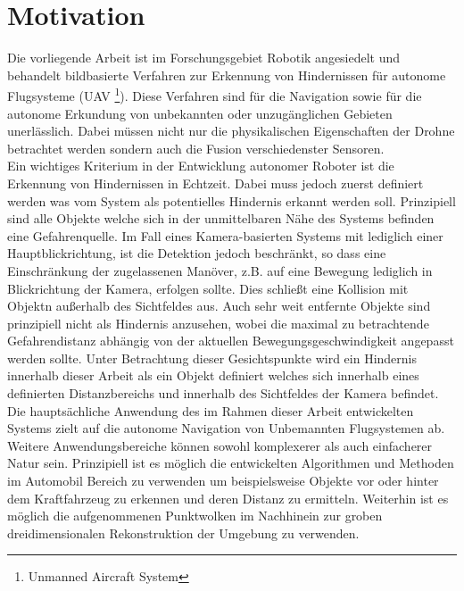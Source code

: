 \section{Motivation}
\label{sec:motivation}

Die vorliegende Arbeit ist im Forschungsgebiet Robotik angesiedelt und behandelt bildbasierte Verfahren zur Erkennung von Hindernissen für autonome Flugsysteme (UAV \footnote{Unmanned Aircraft System}). Diese Verfahren sind für die Navigation sowie für die autonome Erkundung von unbekannten oder unzugänglichen Gebieten unerlässlich. Dabei müssen nicht nur die physikalischen Eigenschaften der Drohne betrachtet werden sondern auch die Fusion verschiedenster Sensoren.\\

\noindent
Ein wichtiges Kriterium in der Entwicklung autonomer Roboter ist die Erkennung von Hindernissen in Echtzeit. Dabei muss jedoch zuerst definiert werden was vom System als potentielles Hindernis erkannt werden soll. Prinzipiell sind alle Objekte welche sich in der unmittelbaren Nähe des Systems befinden eine Gefahrenquelle. Im Fall eines Kamera-basierten Systems mit lediglich einer Hauptblickrichtung, ist die Detektion jedoch beschränkt, so dass eine Einschränkung der zugelassenen Manöver, z.B. auf eine Bewegung lediglich in Blickrichtung der Kamera, erfolgen sollte. Dies schließt eine Kollision mit Objektn außerhalb des Sichtfeldes aus. Auch sehr weit entfernte Objekte sind prinzipiell nicht als Hindernis anzusehen, wobei die maximal zu betrachtende Gefahrendistanz abhängig von der aktuellen Bewegungsgeschwindigkeit angepasst werden sollte. Unter Betrachtung dieser Gesichtspunkte wird ein Hindernis innerhalb dieser Arbeit als ein Objekt definiert welches sich innerhalb eines definierten Distanzbereichs und innerhalb des Sichtfeldes der Kamera befindet.\\

\noindent
Die hauptsächliche Anwendung des im Rahmen dieser Arbeit entwickelten Systems zielt auf die autonome Navigation von Unbemannten Flugsystemen ab. Weitere Anwendungsbereiche können sowohl komplexerer als auch einfacherer Natur sein. Prinzipiell ist es möglich die entwickelten Algorithmen und Methoden im Automobil Bereich zu verwenden um beispielsweise Objekte vor oder hinter dem Kraftfahrzeug zu erkennen und deren Distanz zu ermitteln. Weiterhin ist es möglich die aufgenommenen Punktwolken im Nachhinein zur groben dreidimensionalen Rekonstruktion der Umgebung zu verwenden. 


